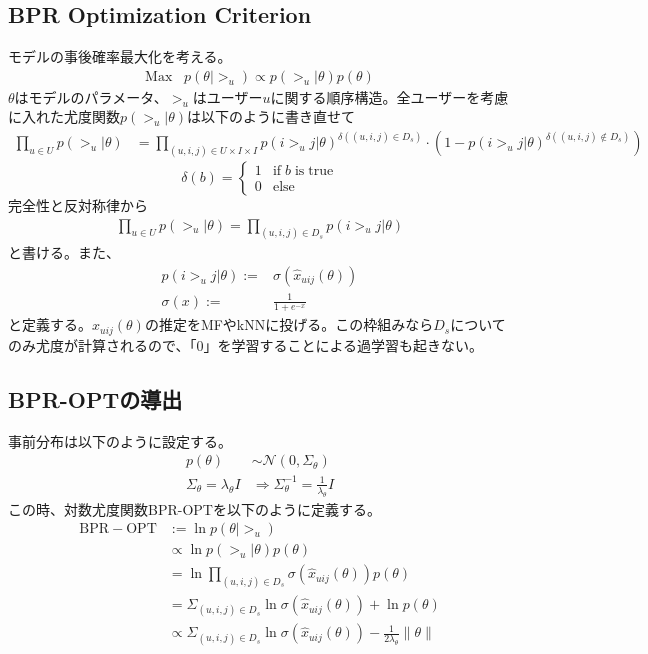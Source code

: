 \documentclass[onecolumn,10pt]{article}
\begin{document}
\subsection{BPR Optimization Criterion}
モデルの事後確率最大化を考える。
\begin{align}
	\mathrm{Max} \;\;\; p(\theta | >_u) \propto p(>_u | \theta)p(\theta)
\end{align}
$\theta$はモデルのパラメータ、$>_u$はユーザー$u$に関する順序構造。全ユーザーを考慮に入れた尤度関数$ p(>_u | \theta)$は以下のように書き直せて
\begin{align}
	\prod_{u \in U} p(>_{u} | \theta) &= \prod_{(u, i, j) \in U \times I \times I} p(i >_u j | \theta)^{\delta((u, i, j) \in D_s)} \cdot \left( 1 -   p(i >_u j | \theta)^{\delta((u, i, j) \not\in D_s)} \right)
\end{align}
\begin{equation}
\delta (b) = \left\{
\begin{array}{ll}
1 & \mathrm{if}\;b\; \mathrm{is\;true} \\
0 & \mathrm{else}
\end{array}
\right.
\end{equation}
完全性と反対称律から
\begin{align}
	\prod_{u \in U} p(>_{u} | \theta) = \prod_{(u, i, j) \in D_s} p(i >_u j | \theta)
\end{align}
と書ける。また、
\begin{align}
	p(i >_u j | \theta) :=& \sigma \left(\hat x_{uij} \left(\theta \right) \right) \\
	\sigma \left( x \right) :=& \frac{1}{1 + e^{-x}}
\end{align}
と定義する。$\hat x_{uij} \left( \theta \right)$の推定をMFやkNNに投げる。この枠組みなら$D_s$についてのみ尤度が計算されるので、「0」を学習することによる過学習も起きない。

\subsection{BPR-OPTの導出}
事前分布は以下のように設定する。
\begin{align}
	p(\theta) &\sim \mathcal{N}\left(0, \Sigma_{\theta} \right) \\
	\Sigma_{\theta} = \lambda_{\theta} I &\Rightarrow \Sigma^{-1}_{\theta} = \frac{1}{\lambda_{\theta}} I
\end{align}
この時、対数尤度関数BPR-OPTを以下のように定義する。
\begin{align}
	\mathrm{BPR-OPT} &:= \ln p\left(\theta | >_u \right) \\
	&\propto \ln p\left(>_u | \theta \right) p(\theta) \\
	&= \ln \prod_{(u,i,j) \in D_s} \sigma \left( \hat x_{uij} \left(\theta \right) \right) p \left(\theta \right) \\
	&= \Sigma_{(u,i,j) \in D_s} \ln \sigma \left( \hat x_{uij} \left(\theta \right) \right) + \ln p \left(\theta \right) \\
	&\propto  \Sigma_{(u,i,j) \in D_s}  \ln \sigma \left( \hat x_{uij} \left(\theta \right) \right) - \frac{1}{2\lambda_\theta} \|\theta\|
\end{align}
\end{document}
